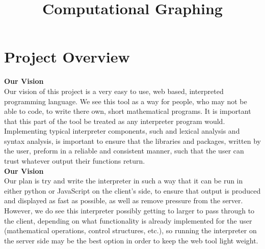 \documentclass[12pt]{article}
\title{Computational Graphing}
\begin{document}
    \newcommand{\titleimage}{compiax.png}
    \newcommand{\titlecompany}{Compiax}
    
    
    
	
	

	\newpage
	\section{Project Overview}

	\textbf{Our Vision}\\
	Our vision of this project is a very easy to use, web based, interpreted programming language. We see this tool as a way for people, 
    who may not be able to code, to write there own, short mathematical programs. It is important that this part of the tool be treated as
    any interpreter program would. Implementing typical interpreter components, such and lexical analysis and syntax analysis, is important
    to ensure that the libraries and packages, written by the user, preform in a reliable and consistent manner, such that the user can 
    trust whatever output their functions return. \\
    
	\textbf{Our Vision}\\    
    Our plan is try and write the interpreter in such a way that it can be run in either python
    or JavaScript on the client's side, to ensure that output is produced and displayed as fast as possible, as well as remove pressure 
    from the server. However, we do see this interpreter possibly getting to larger to pass through to the client, depending on what 
    functionality is already implemented for the user (mathematical operations, control structures, etc.), so running the interpreter on the
    server side may be the best option in order to keep the web tool light weight. \\
\end{document}
